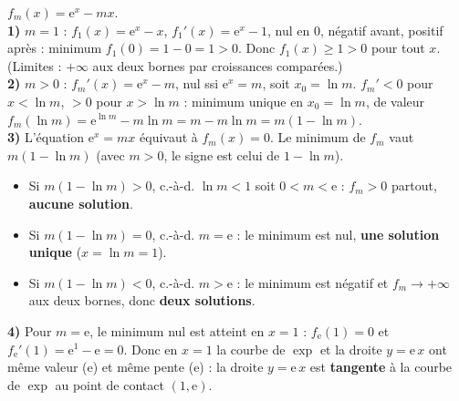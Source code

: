 $f_m(x)=\mathrm{e}^{x}-mx$.\\
\textbf{1)} $m=1$ : $f_1(x)=\mathrm{e}^{x}-x$, $f_1'(x)=\mathrm{e}^{x}-1$, nul en $0$, négatif
avant, positif après : minimum $f_1(0)=1-0=1>0$. Donc $f_1(x)\ge1>0$ pour tout $x$. (Limites :
$+\infty$ aux deux bornes par croissances comparées.)\\
\textbf{2)} $m>0$ : $f_m'(x)=\mathrm{e}^{x}-m$, nul ssi $\mathrm{e}^{x}=m$, soit $x_0=\ln m$.
$f_m'<0$ pour $x<\ln m$, $>0$ pour $x>\ln m$ : minimum unique en $x_0=\ln m$, de valeur
$f_m(\ln m)=\mathrm{e}^{\ln m}-m\ln m=m-m\ln m=m(1-\ln m)$.\\
\textbf{3)} L'équation $\mathrm{e}^{x}=mx$ équivaut à $f_m(x)=0$. Le minimum de $f_m$ vaut
$m(1-\ln m)$ (avec $m>0$, le signe est celui de $1-\ln m$).
\begin{itemize}
\item Si $m(1-\ln m)>0$, c.-à-d. $\ln m<1$ soit $0<m<\mathrm{e}$ : $f_m>0$ partout,
\textbf{aucune solution}.
\item Si $m(1-\ln m)=0$, c.-à-d. $m=\mathrm{e}$ : le minimum est nul, \textbf{une solution unique}
($x=\ln m=1$).
\item Si $m(1-\ln m)<0$, c.-à-d. $m>\mathrm{e}$ : le minimum est négatif et $f_m\to+\infty$ aux
deux bornes, donc \textbf{deux solutions}.
\end{itemize}
\textbf{4)} Pour $m=\mathrm{e}$, le minimum nul est atteint en $x=1$ : $f_{\mathrm{e}}(1)=0$ et
$f_{\mathrm{e}}'(1)=\mathrm{e}^{1}-\mathrm{e}=0$. Donc en $x=1$ la courbe de $\exp$ et la droite
$y=\mathrm{e}\,x$ ont même valeur ($\mathrm{e}$) et même pente ($\mathrm{e}$) : la droite
$y=\mathrm{e}\,x$ est \textbf{tangente} à la courbe de $\exp$ au point de contact $(1,\mathrm{e})$.
